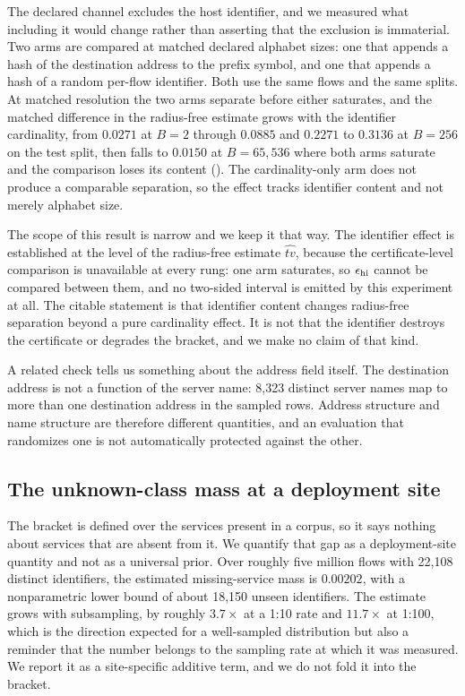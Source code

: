 The declared channel excludes the host identifier, and we measured what
including it would change rather than asserting that the exclusion is
immaterial. Two arms are compared at matched declared alphabet sizes: one that
appends a hash of the destination address to the prefix symbol, and one that
appends a hash of a random per-flow identifier. Both use the same flows and the
same splits. At matched resolution the two arms separate before either
saturates, and the matched difference in the radius-free estimate grows with the
identifier cardinality, from $0.0271$ at $B{=}2$ through $0.0885$ and $0.2271$ to
$0.3136$ at $B{=}256$ on the test split, then falls to $0.0150$ at $B{=}65{,}536$
where both arms saturate and the comparison loses its content
(). The cardinality-only arm does not produce a comparable
separation, so the effect tracks identifier content and not merely alphabet size.

The scope of this result is narrow and we keep it that way. The identifier
effect is established at the level of the radius-free estimate $\widehat{tv}$,
because the certificate-level comparison is unavailable at every rung: one arm
saturates, so $\epsilon_{\mathrm{hi}}$ cannot be compared between them, and no two-sided
interval is emitted by this experiment at all. The citable statement is that
identifier content changes radius-free separation beyond a pure cardinality
effect. It is not that the identifier destroys the certificate or degrades the
bracket, and we make no claim of that kind.

A related check tells us something about the address field itself. The
destination address is not a function of the server name: 8,323 distinct server
names map to more than one destination address in the sampled rows. Address
structure and name structure are therefore different quantities, and an
evaluation that randomizes one is not automatically protected against the other.

\subsection{The unknown-class mass at a deployment site}
\label{sec:discussion/missing_mass}

The bracket is defined over the services present in a corpus, so it says nothing
about services that are absent from it. We quantify that gap as a
deployment-site quantity and not as a universal prior. Over roughly five million
flows with 22,108 distinct identifiers, the estimated missing-service mass is
$0.00202$, with a nonparametric lower bound of about 18,150 unseen identifiers.
The estimate grows with subsampling, by roughly $3.7\times$ at a 1:10 rate and
$11.7\times$ at 1:100, which is the direction expected for a well-sampled
distribution but also a reminder that the number belongs to the sampling rate at
which it was measured. We report it as a site-specific additive term, and we do
not fold it into the bracket.

